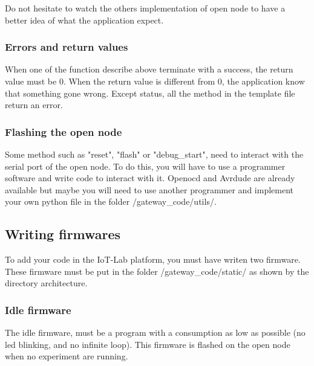\documentclass[12pt,a4paper,twoside]{article}
\begin{document}
Do not hesitate to watch the others implementation of open node to have a better idea of what the application expect.\newline

\subsubsection{Errors and return values}
When one of the function describe above terminate with a success, the return value must be 0.\newline
When the return value is different from 0, the application know that something gone wrong.\newline
Except status, all the method in the template file return an error.

\subsubsection{Flashing the open node}
Some method such as "reset", "flash" or "debug\_start", need to interact with the serial port of the open node. To do this, you will have to use a programmer software and write code to interact with it. Openocd and Avrdude are already available but maybe you will need to use another programmer and implement your own python file in the folder /gateway\_code/utils/.  
\subsection{Writing firmwares}
To add your code in the IoT-Lab platform, you must have writen two firmware.
These firmware must be put in the folder /gateway\_code/static/ as shown by the directory architecture.
\subsubsection{Idle firmware}
The idle firmware, must be a program with a consumption as low as possible (no led blinking, and no infinite loop). This firmware is flashed on the open node when no experiment are running.
\end{document}
